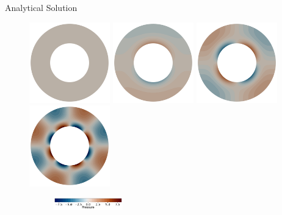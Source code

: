 \documentclass[10pt,aspectratio=169]{beamer}
\begin{document}
\begin{frame}{Analytical Solution}
	\begin{figure}[!htb]
		\vspace{-0.5in}
		\begin{multicols}{4}
			\includegraphics[width=3.5cm]{./model_k_0_res_32_vdeg_2_pdeg_1_pcont_True_vel_penalty_1.0e+08_stokes_tol_1.0e-10/p_ana.png}\par
			\hspace{0.75in}
			\includegraphics[width=3.5cm]{./model_k_1_res_32_vdeg_2_pdeg_1_pcont_True_vel_penalty_1.0e+08_stokes_tol_1.0e-10/p_ana.png}\par
			\hspace{1.5in}
			\includegraphics[width=3.5cm]{./model_k_2_res_32_vdeg_2_pdeg_1_pcont_True_vel_penalty_1.0e+08_stokes_tol_1.0e-10/p_ana.png}\par
			\hspace{2.25in}
			\includegraphics[width=3.5cm]{./model_k_4_res_32_vdeg_2_pdeg_1_pcont_True_vel_penalty_1.0e+08_stokes_tol_1.0e-10/p_ana.png}
		\end{multicols}
		\vspace{-0.27in}
		\begin{figure}
			\hspace{0.1in} 
			\includegraphics[width=3cm]{./model_k_0_res_32_vdeg_2_pdeg_1_pcont_True_vel_penalty_1.0e+08_stokes_tol_1.0e-10/p_ana_cbhorz.pdf}
		\end{figure}
	\end{figure}
\end{frame}
\end{document}
